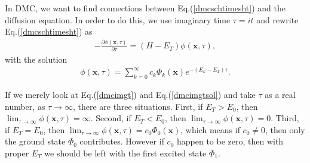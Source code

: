 \documentclass[12pt,letterpaper,UTF8]{report}
\begin{document}
{In DMC, we want to find connections between Eq.(\ref{dmcschtimesht}) and the diffusion equation. In order to do this, we use imaginary time $\tau = i t$ and rewrite Eq.(\ref{dmcschtimesht}) as
\begin{eqnarray}
-\frac{\partial \phi(\bm{x},\tau)}{\partial \tau} = (H - E_T) \phi(\bm{x},\tau), \label{dmcimgt}
 \end{eqnarray}
with the solution
\begin{eqnarray}
\phi(\bm{x},\tau) = \sum_{k=0}^{\infty} c_k \Phi_k(\bm{x}) e^{- (E_k - E_T) \tau}. \label{dmcimgtsol}
 \end{eqnarray}

If we merely look at Eq.(\ref{dmcimgt}) and Eq.(\ref{dmcimgtsol}) and take $\tau$ as a real number,
as $\tau \rightarrow \infty$, there are three situations. First,  if $E_T>E_0$, then $\lim_{\tau \rightarrow \infty} \phi(\bm{x},\tau) = \infty $. Second,  if $E_T<E_0$, then $\lim_{\tau \rightarrow \infty} \phi(\bm{x},\tau) = 0$. Third, if $E_T=E_0$, then $ \lim_{\tau \rightarrow \infty} \phi(\bm{x},\tau) = c_0 \Phi_0 (\bm{x})$, which means if $c_0 \neq 0$, then only the ground state $\Phi_0$ contributes. However if $c_0$ happen to be zero, then with proper $E_T$ we should be left with the first excited state $\Phi_1$.

}
\end{document}
